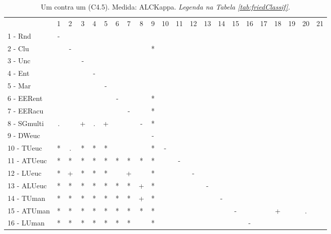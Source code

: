 \begin{table}[h]
\caption{Um contra um (C4.5). Medida: ALCKappa. \textit{Legenda na Tabela \ref{tab:friedClassif}.}}
\begin{center}\begin{tabular}{lcc|cc|cc|cc|cc|cc|cc|cc|cc|cc|c}
 			& 1 & 2 & 3 & 4 & 5 & 6 & 7 & 8 & 9 & 10 & 11 & 12 & 13 & 14 & 15 & 16 & 17 & 18 & 19 & 20 & 21\\
1 - Rnd  	& - &   &   &   &   &   &   &   &   &   &   &   &   &   &   &   &   &   &   &   &   \\
2 - Clu  	&   & - &   &   &   &   &   &   & * &   &   &   &   &   &   &   &   &   &   &   &   \\ \hline
3 - Unc  	&   &   & - &   &   &   &   &   &   &   &   &   &   &   &   &   &   &   &   &   &   \\
4 - Ent  	&   &   &   & - &   &   &   &   &   &   &   &   &   &   &   &   &   &   &   &   &   \\ \hline
5 - Mar  	&   &   &   &   & - &   &   &   &   &   &   &   &   &   &   &   &   &   &   &   &   \\
6 - EERent	&   &   &   &   &   & - &   &   & * &   &   &   &   &   &   &   &   &   &   &   &   \\ \hline
7 - EERacu	&   &   &   &   &   &   & - &   & * &   &   &   &   &   &   &   &   &   &   &   &   \\
8 - SGmulti	& . &   & + & . & + &   &   & - & * &   &   &   &   &   &   &   &   &   &   &   &   \\ \hline
9 - DWeuc	&   &   &   &   &   &   &   &   & - &   &   &   &   &   &   &   &   &   &   &   &   \\
10 - TUeuc	& * & . & * & * & * &   &   &   & * & - &   &   &   &   &   &   &   &   &   &   &   \\ \hline
11 - ATUeuc	& * & * & * & * & * & * & * & * & * &   & - &   &   &   &   &   &   &   &   &   &   \\
12 - LUeuc	& * & + & * & * & * &   & + &   & * &   &   & - &   &   &   &   &   &   &   &   &   \\ \hline
13 - ALUeuc	& * & * & * & * & * & * & * & + & * &   &   &   & - &   &   &   &   &   &   &   &   \\
14 - TUman	& * & * & * & * & * & * & * & + & * &   &   &   &   & - &   &   &   &   &   &   &   \\ \hline
15 - ATUman	& * & * & * & * & * & * & * & * & * &   &   &   &   &   & - &   &   & + &   & . &   \\
16 - LUman	& * & * & * & * & * & * & * &   & * &   &   &   &   &   &   & - &   &   &   &   &   \\ \hline

\end{tabular}
\end{center}
\end{table}
